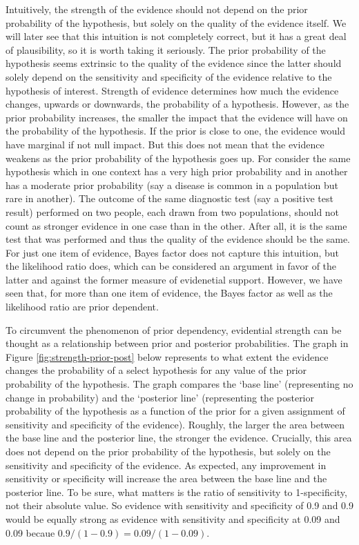 \documentclass[
  10pt,
  dvipsnames,enabledeprecatedfontcommands]{scrartcl}
\begin{document}
Intuitively, the strength of the evidence should not depend on the prior
probability of the hypothesis, but solely on the quality of the evidence
itself. We will later see that this intuition is not completely correct,
but it has a great deal of plausibility, so it is worth taking it
seriously. The prior probability of the hypothesis seems extrinsic to
the quality of the evidence since the latter should solely depend on the
sensitivity and specificity of the evidence relative to the hypothesis
of interest. Strength of evidence determines how much the evidence
changes, upwards or downwards, the probability of a hypothesis. However,
as the prior probability increases, the smaller the impact that the
evidence will have on the probability of the hypothesis. If the prior is
close to one, the evidence would have marginal if not null impact. But
this does not mean that the evidence weakens as the prior probability of
the hypothesis goes up. For consider the same hypothesis which in one
context has a very high prior probability and in another has a moderate
prior probability (say a disease is common in a population but rare in
another). The outcome of the same diagnostic test (say a positive test
result) performed on two people, each drawn from two populations, should
not count as stronger evidence in one case than in the other. After all,
it is the same test that was performed and thus the quality of the
evidence should be the same. For just one item of evidence, Bayes factor
does not capture this intuition, but the likelihood ratio does, which
can be considered an argument in favor of the latter and against the
former measure of evidenetial support. However, we have seen that, for
more than one item of evidence, the Bayes factor as well as the
likelihood ratio are prior dependent.

To circumvent the phenomenon of prior dependency, evidential strength
can be thought as a relationship between prior and posterior
probabilities. The graph in Figure \ref{fig:strength-prior-post} below
represents to what extent the evidence changes the probability of a
select hypothesis for any value of the prior probability of the
hypothesis. The graph compares the `base line' (representing no change
in probability) and the `posterior line' (representing the posterior
probability of the hypothesis as a function of the prior for a given
assignment of sensitivity and specificity of the evidence). Roughly, the
larger the area between the base line and the posterior line, the
stronger the evidence. Crucially, this area does not depend on the prior
probability of the hypothesis, but solely on the sensitivity and
specificity of the evidence. As expected, any improvement in sensitivity
or specificity will increase the area between the base line and the
posterior line. To be sure, what matters is the ratio of sensitivity to
1-specificity, not their absolute value. So evidence with sensitivity
and specificity of 0.9 and 0.9 would be equally strong as evidence with
sensitivity and specificity at 0.09 and 0.09 becaue
\(0.9/(1-0.9) = 0.09/(1-0.09)\).
\end{document}
